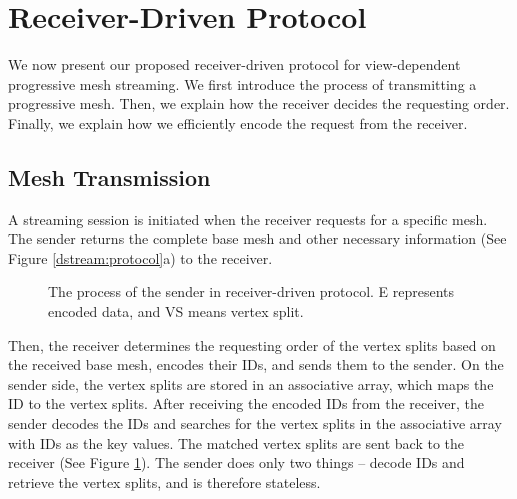 \section{Receiver-Driven Protocol}
     \label{s:dstream:protocol}
	 We now present our proposed receiver-driven protocol
     for view-dependent progressive mesh streaming.
     We first introduce the process of transmitting 
     a progressive mesh. Then, we explain how the receiver decides the requesting order.
     Finally, we explain how we efficiently encode the request from the receiver.
     
     \subsection{Mesh Transmission} 
     A streaming session is initiated when the receiver requests for a specific
     mesh.
     The sender returns the complete base mesh and other necessary information
     (See Figure \ref{dstream:protocol}a) to the receiver.
     
     \begin{figure}
     \centering
     \caption{The process of the sender in receiver-driven protocol. 
     E represents encoded data, and VS means vertex split. \label{dstream:process}}
     \end{figure}
     Then, the receiver determines
     the requesting order of the vertex splits based on the received base mesh, 
     encodes their IDs, and
     sends them to the sender. On the sender side, the vertex splits are stored
     in an associative array, which maps the ID to the vertex splits. 
     After receiving the encoded IDs from the receiver, 
     the sender decodes the IDs and searches for the vertex splits 
     in the associative array
     with IDs as the key values. The matched vertex splits
     are sent back to the receiver (See Figure \ref{dstream:process}). 
     The sender does only two things -- decode IDs and retrieve the 
     vertex splits, and is therefore stateless. 

